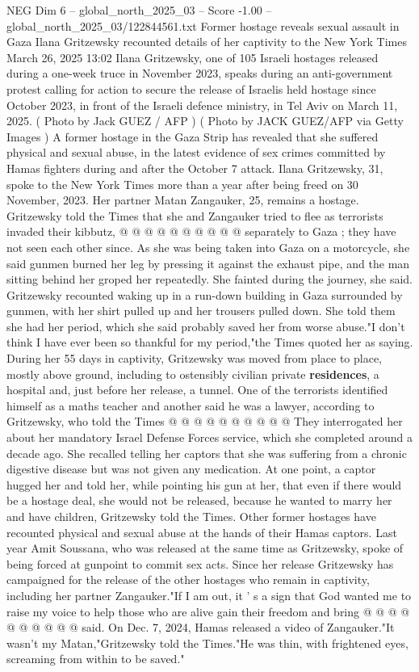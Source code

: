 \begin{textsample}{NEG Dim 6 – global\_north\_2025\_03 – Score -1.00 – global\_north\_2025\_03/122844561.txt}  \label{ex:f6_neg_229}
Former hostage reveals sexual assault in Gaza Ilana Gritzewsky recounted details of her captivity to the New York Times March 26, 2025 13:02 Ilana Gritzewsky, one of 105 Israeli hostages released during a one-week truce in November 2023, speaks during an anti-government protest calling for action to secure the release of Israelis held hostage since October 2023, in front of the Israeli defence ministry, in Tel Aviv on March 11, 2025. ( Photo by Jack GUEZ / AFP ) ( Photo by JACK GUEZ/AFP via Getty Images ) A former hostage in the Gaza Strip has revealed that she suffered physical and sexual abuse, in the latest evidence of sex crimes committed by Hamas fighters during and after the October 7 attack.
Ilana Gritzewsky, 31, spoke to the New York Times more than a year after being freed on 30 November, 2023.
Her partner Matan Zangauker, 25, remains a hostage.
Gritzewsky told the Times that she and Zangauker tried to flee as terrorists invaded their kibbutz, @ @ @ @ @ @ @ @ @ @ separately to Gaza ; they have not seen each other since.
As she was being taken into Gaza on a motorcycle, she said gunmen burned her leg by pressing it against the exhaust pipe, and the man sitting behind her groped her repeatedly.
She fainted during the journey, she said.
Gritzewsky recounted waking up in a run-down building in Gaza surrounded by gunmen, with her shirt pulled up and her trousers pulled down.
She told them she had her period, which she said probably saved her from worse abuse."I don't think I have ever been so thankful for my period,"the Times quoted her as saying.
During her 55 days in captivity, Gritzewsky was moved from place to place, mostly above ground, including to ostensibly civilian private \textbf{residences}, a hospital and, just before her release, a tunnel.
One of the terrorists identified himself as a maths teacher and another said he was a lawyer, according to Gritzewsky, who told the Times @ @ @ @ @ @ @ @ @ @ They interrogated her about her mandatory Israel Defense Forces service, which she completed around a decade ago.
She recalled telling her captors that she was suffering from a chronic digestive disease but was not given any medication.
At one point, a captor hugged her and told her, while pointing his gun at her, that even if there would be a hostage deal, she would not be released, because he wanted to marry her and have children, Gritzewsky told the Times.
Other former hostages have recounted physical and sexual abuse at the hands of their Hamas captors.
Last year Amit Soussana, who was released at the same time as Gritzewsky, spoke of being forced at gunpoint to commit sex acts.
Since her release Gritzewsky has campaigned for the release of the other hostages who remain in captivity, including her partner Zangauker."If I am out, it ' s a sign that God wanted me to raise my voice to help those who are alive gain their freedom and bring @ @ @ @ @ @ @ @ @ @ said.
On Dec. 7, 2024, Hamas released a video of Zangauker."It wasn't my Matan,"Gritzewsky told the Times."He was thin, with frightened eyes, screaming from within to be saved."

\end{textsample}
